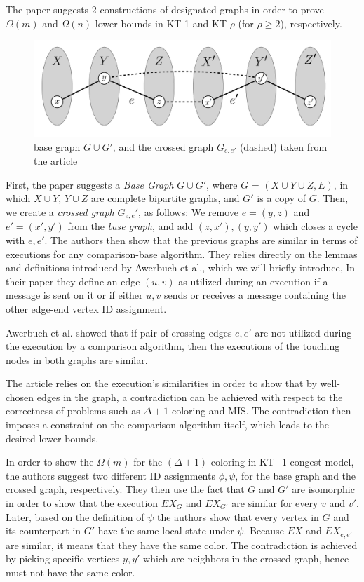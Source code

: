 \documentclass[11pt]{article}
\begin{document}
The paper suggests 2 constructions of designated graphs in order to prove $\Omega(m)$ and $\Omega(n)$ lower bounds in KT-1 and KT-$\rho$ (for $\rho \ge 2$), respectively. 
\begin{figure}[h]
    \centering
    \includegraphics[scale=0.7]{graph_cross_graph}
    \caption{base graph $G \cup G'$, and the crossed graph $G_{e,e'}$ (dashed) taken from the article}
    \label{fig:graph_cross_graph}
\end{figure}
First, the paper suggests a \textit{Base Graph} $G \cup G'$, where $G$ = $( X \cup Y \cup Z, E)$, in which $X \cup Y$, $Y \cup Z$ are complete bipartite graphs, and $G'$ is a copy of $G$. 
Then, we create a \textit{crossed graph} $G_{e,e}'$, as follows: 
We remove $e=(y,z)$ and $e'=(x',y')$ from the \textit{base graph}, and add $(z,x'), (y,y')$ which closes a cycle with $e,e'$. The authors then show that the previous graphs are similar in terms of executions for any comparison-base algorithm. They relies directly on the lemmas and definitions introduced by Awerbuch et al.\cite{Awerbuch}, which we will briefly introduce, In their paper they define an edge $(u,v)$ as utilized during an execution if a message is sent on it or if either $u, v$ sends or receives a message containing the other edge-end vertex ID assignment.

Awerbuch et al. showed that if pair of crossing edges $e, e'$ are not utilized during the execution by a comparison algorithm, then the executions of the touching nodes in both graphs are similar.

The article relies on the execution's similarities in order to show that by well-chosen edges in the graph, a contradiction can be achieved with respect to the correctness of problems such as $\Delta +1$ coloring and MIS. The contradiction then imposes a constraint on the comparison algorithm itself, which leads to the desired lower bounds.

In order to show the $\Omega(m)$ for the $(\Delta +1)$-coloring in KT$-1$ congest model, the authors suggest two different ID assignments $\phi, \psi$, for the base graph and the crossed graph, respectively. They then use the fact that $G$ and $G'$ are isomorphic in order to show that the execution $EX_G$ and $EX_{G'}$ are similar for every $v$ and $v'$. Later, based on the definition of $\psi$ the authors show that every vertex in $G$ and its counterpart in $G'$ have the same local state under $\psi$. Because $EX$ and $EX_{e,e'}$ are similar, it means that they have the same color. The contradiction is achieved by picking specific vertices $y,y'$ which are neighbors in the crossed graph, hence must not have the same color.
\end{document}
